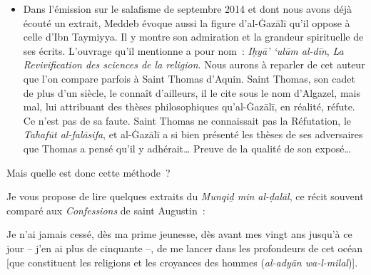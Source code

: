 \begin{itemize}
\item
  Dans l'émission sur le salafisme de septembre 2014 et dont nous avons
  déjà écouté un extrait, Meddeb évoque aussi la figure d'al-Ġazālī \label{theol:AlGazali1}
  qu'il oppose à celle d'Ibn Taymiyya. Il y montre son admiration et la
  grandeur spirituelle de ses écrits. L'ouvrage qu'il mentionne a pour
  nom~: \emph{Iḥyā' `ulūm al-dīn}, \emph{La Revivification des sciences
  de la religion}. Nous
  aurons à reparler de cet auteur que l'on compare parfois à Saint
  Thomas d'Aquin. Saint Thomas, son cadet de plus d'un siècle, le
  connaît d'ailleurs, il le cite sous le nom d'Algazel, mais mal, lui
  attribuant des thèses philosophiques qu'al-Ġazālī, en réalité, réfute.
  Ce n'est pas de sa faute. Saint Thomas ne connaissait pas la
  Réfutation, le \emph{Tahafūt al-falāsifa}, et al-Ġazālī a si bien
  présenté les thèses de ses adversaires que Thomas a pensé qu'il y
  adhérait\ldots{} Preuve de la qualité de son exposé\ldots{}
\end{itemize}

Mais quelle est donc cette méthode~?


Je vous propose de lire quelques extraits du \emph{Munqiḏ min
al-ḍalāl}, ce récit souvent comparé aux \emph{Confessions}
de saint Augustin~:

Je n'ai jamais cessé, dès ma prime jeunesse, dès avant mes vingt ans
jusqu'à ce jour -- j'en ai plus de cinquante --, de me lancer dans les
profondeurs de cet océan {[}que constituent les religions et les
croyances des hommes (\emph{al-adyān wa-l-milal}){]}.

